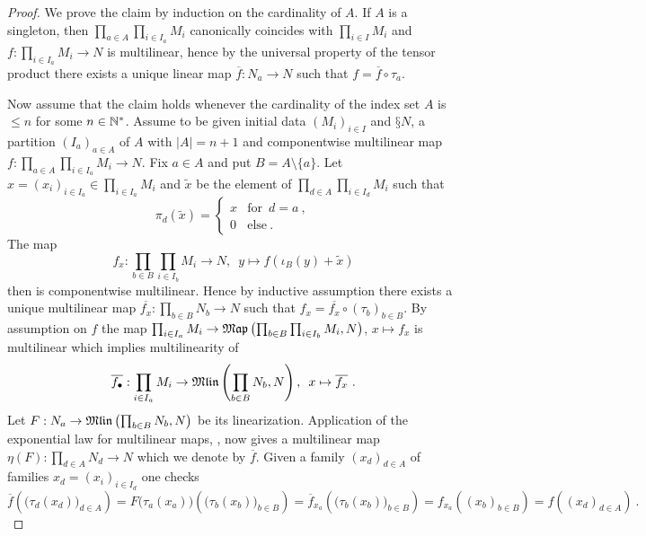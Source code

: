\begin{proof}
  We prove the claim by induction on the cardinality of $A$. 
  If $A$ is a singleton, then $\prod_{a \in A} \prod_{i\in I_a} M_i$ canonically
  coincides with $\prod_{i\in I} M_i$ and $f: \prod_{i\in I_a} M_i \to N$
  is multilinear, hence by the universal property of the tensor product there
  exists a unique linear map $\overline{f}: N_a \to N$ such that
  $f = \overline{f} \circ \tau_a$. 

  Now assume that the claim holds whenever the cardinality of the index set $A$ is
  $\leq n$ for some $n \in \mathbb{N}^*$.
  Assume to be given initial data $(M_i)_{i\in I}$ and $§N$, a partition
  $(I_a)_{a\in A}$ of $A$ with $|A| = n+1$ and  componentwise multilinear map
  $f: \prod_{a\in A}\prod_{i\in I_a} M_i \to N$. Fix $a \in A$ and put
  $B =A \setminus \{ a\}$. Let
  $x = (x_i)_{i\in I_a} \in \prod_{i\in I_a}M_i$
  and $\widetilde{x}$ be the element of $ \prod_{d\in A}\prod_{i\in I_d} M_i $ such that
  \[
    \pi_d (\widetilde{x}) =
    \begin{cases}
      x &\text{for} \enspace d = a \ , \\
      0 &\text{else} \ .
    \end{cases}
  \]
  The map
  \[
    f_x: \prod_{b\in B}\prod_{i\in I_b} M_i \to N , \enspace
         y  \mapsto f (\iota_B (y) + \widetilde{x}) 
  \]
  then is componentwise multilinear. Hence by inductive assumption there  exists
  a unique multilinear map $\overline{f_x} : \prod_{b\in B}N_b \to N$ such that
  $f_x = \overline{f_x}\circ (\tau_b)_{b\in B}$. By assumption on $f$
  the map
  $\prod_{i\in I_a} M_i \to \mathfrak{Map} \left( \prod_{b\in B} \prod_{i\in I_b} M_i,N\right) $,
  $x \mapsto f_x$ is multilinear which implies multilinearity of
  \[
    \overline{f_\bullet} :
    \prod_{i\in I_a} M_i \to \mathfrak{Mlin} \left( \prod_{b\in B} N_b ,N \right),
    \enspace x \mapsto \overline{f_x} \ .
  \]
  Let $F: N_a \to \mathfrak{Mlin} \left( \prod_{b\in B} N_b,N \right)$ be its
  linearization. Application of the exponential law for multilinear maps,
  , now gives a
  multilinear map $\eta (F) : \prod_{d \in A} N_d \to N$ which we denote 
  by $\overline{f}$. Given a family $(x_d)_{d\in A}$ of families
  $x_d =(x_i)_{i\in I_d}$ one checks
  \[
    \overline{f} \left( \big(\tau_d (x_d)\big)_{d\in A} \right)
    = F \big( \tau_a(x_a) \big) \left( \big(\tau_b (x_b)\big)_{b\in B} \right)
    = \overline{f}_{x_a} \left( \big(\tau_b (x_b)\big)_{b\in B} \right)
    = f_{x_a} \left( (x_b)_{b\in B} \right) = f  \left( (x_d)_{d\in A} \right) \ .
\]
\end{proof}
